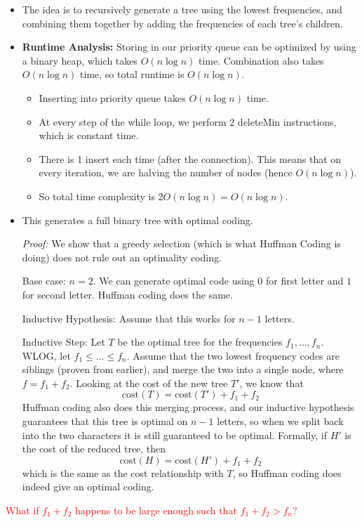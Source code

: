 \documentclass[10pt]{article}
\newcommand{\question}[1]{\textcolor{red}{#1}}
\begin{document}
	\begin{itemize}
		\item The idea is to recursively generate a tree using the lowest frequencies, and combining them 
			together by adding the frequencies of each tree's children. 
		\item \textbf{Runtime Analysis:} Storing in our priority queue can be optimized by using a binary heap, 
			which takes $O(n \log n)$ time. Combination also takes $O(n \log n)$ time, so total runtime
			 is $O(n \log n)$.
			\begin{itemize}
				\item Inserting into priority queue takes $O(n \log n)$ time. 
				\item At every step of the while loop, we perform 2 deleteMin instructions, which is constant
					time.
				\item There is 1 insert each time (after the connection). This means that on every 
					iteration, we are halving the number of nodes (hence $O(n \log n)$). 
				\item So total time complexity is $2O(n \log n) = O(n \log n)$.
			\end{itemize}
		 \item This generates a full binary tree with optimal coding. 

			 \textit{Proof:} We show that a greedy selection (which is what Huffman Coding is doing) does not 
			 rule out an optimality coding.

			Base case: $n = 2$. We can generate optimal code using $0$ for first letter and $1$ for 
			second letter. Huffman coding does the same.

			Inductive Hypothesis: Assume that this works for $n-1$ letters.

			Inductive Step: Let $T$ be the optimal tree for the frequencies $f_1, \dots, f_n$. WLOG, let 
			$f_1 \le \dots \le f_n$. Assume that the two lowest frequency codes are siblings (proven 
			from earlier), and merge the two into a single node, where $f = f_1 + f_2$. Looking at the cost 
			of the new tree $T'$, we know that 
			\[
				\mathrm{cost}(T) = \mathrm{cost}(T') + f_1 + f_2
			\] 
			Huffman coding also does this merging process, and our inductive hypothesis guarantees that this 
			tree is optimal on $n-1$ letters, so when we split back into the two characters it is still
			guaranteed to be optimal. Formally, if $H'$ is the cost of the reduced tree, then
			\[
				\mathrm{cost}(H) = \mathrm{cost}(H') + f_1 + f_2
			\] 
			which is the same as the cost relationship with $T$, so Huffman coding does indeed give an optimal 
			coding.
	\end{itemize}
	\question{What if $f_1 + f_2$ happens to be large enough such that $f_1 + f_2 > f_n$?}
\end{document}

